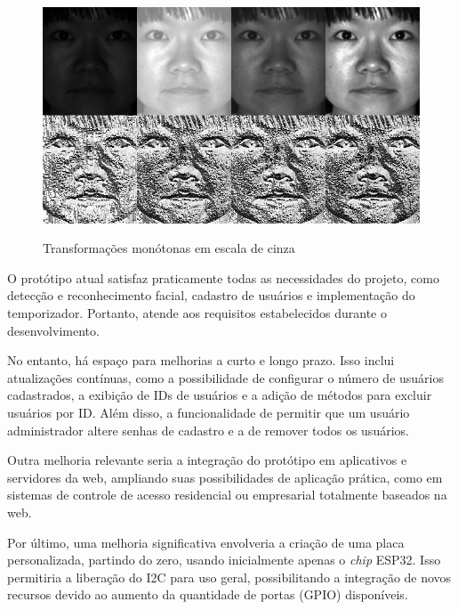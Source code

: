 \begin{figure}[h!]
    \centering
    \caption{Transformações monótonas em escala de cinza}
    \includegraphics[scale=0.5]{figuras/escala_cinza.jpg} 
    \label{fig:espgrayopencv}
    \centering
\end{figure}

O protótipo atual satisfaz praticamente todas as necessidades do projeto, 
como detecção e reconhecimento facial, cadastro de usuários e implementação 
do temporizador. Portanto, atende aos requisitos estabelecidos durante 
o desenvolvimento.

No entanto, há espaço para melhorias a curto e longo prazo. Isso inclui 
atualizações contínuas, como a possibilidade de configurar o número de 
usuários cadastrados, a exibição de IDs de usuários e a adição de 
métodos para excluir usuários por ID. Além disso, a funcionalidade 
de permitir que um usuário administrador altere senhas de cadastro 
e a de remover todos os usuários.

Outra melhoria relevante seria a integração do protótipo em aplicativos 
e servidores da web, ampliando suas possibilidades de aplicação prática, 
como em sistemas de controle de acesso residencial ou empresarial 
totalmente baseados na web.

Por último, uma melhoria significativa envolveria a criação de uma 
placa personalizada, partindo do zero, usando inicialmente apenas o \textit{chip} 
ESP32. Isso permitiria a liberação do I2C para uso geral, 
possibilitando a integração de novos recursos devido ao aumento 
da quantidade de portas (GPIO) disponíveis.